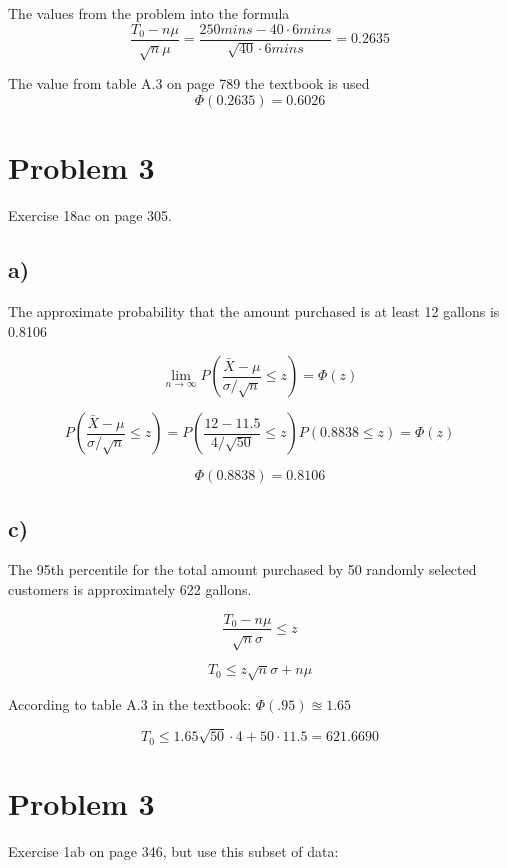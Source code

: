 \documentclass[a4paper,11pt]{article}
\begin{document}
The values from the problem into the formula
\[ \frac{T_0 - n \mu}{\sqrt{n} \mu} = \frac{250 mins - 40 \cdot 6 mins }{\sqrt{40} \cdot 6 mins} = 0.2635 \]

\vspace{1cm}
The value from table A.3  on page 789 the textbook is used
\[ \Phi(0.2635) = 0.6026\]

\clearpage

\section*{Problem 3}

Exercise 18ac on page 305.

\subsection*{a)}

The approximate probability that the amount purchased is at least 12 gallons is 0.8106

\[ \lim_{n \rightarrow \infty} P\left(\frac{\bar{X} - \mu}{\sigma / \sqrt{n}} \le z \right) = \Phi(z)\]

\[ P\left(\frac{\bar{X} - \mu}{\sigma / \sqrt{n}} \le z \right) = P\left(\frac{12 - 11.5}{4 / \sqrt{50}} \le z \right) P(0.8838 \le z) =  \Phi(z)\]

\[\Phi(0.8838) = 0.8106 \]

\subsection*{c)}

The 95th percentile for the total amount purchased by 50 randomly selected customers is approximately 622 gallons.

\[ \frac{T_0 - n \mu}{\sqrt{n} \sigma} \le z\]

\[ T_0 \le z \sqrt{n} \sigma +  n \mu \]

\vspace{5mm}
According to table A.3 in the textbook: $ \Phi(.95) \approxeq 1.65 $

\[ T_0 \le 1.65 \sqrt{50} \cdot 4 +  50 \cdot 11.5 = 621.6690 \]

\clearpage

\section*{Problem 3}

Exercise 1ab on page 346, but use this subset of data:
\end{document}
